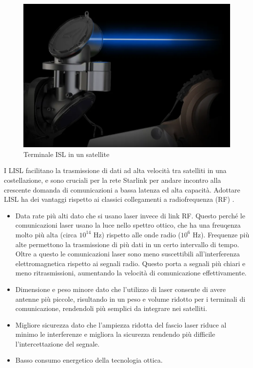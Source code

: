 \begin{figure}[htbp]
  \centering
  \includegraphics[width=0.9\linewidth]{./res/img/LISL_terminal.png}
  \caption{Terminale \ac{ISL} in un satellite \cite{mike_puchol_modeling_2022}}
  \label{fig:starlink-terminal}
\end{figure}

I \ac{LISL} facilitano la trasmissione di dati ad alta velocità tra satelliti in una costellazione, e sono cruciali per la rete Starlink per andare incontro alla crescente domanda di comunicazioni a bassa latenza ed alta capacità.
Adottare \ac{LISL} ha dei vantaggi rispetto ai classici collegamenti a radiofrequenza (\ac{RF}) \cite{chaudhry_laser_2021}.
\begin{itemize}
  \item Data rate più alti dato che si usano laser invece di link \ac{RF}. Questo perché le comunicazioni laser usano la luce nello spettro ottico, che ha una freuqenza molto più alta (circa $10^{14}$ Hz) rispetto alle onde radio ($10^{6}$ Hz). Frequenze più alte permettono la trasmissione di più dati in un certo intervallo di tempo. Oltre a questo le comunicazioni laser sono meno suscettibili all'interferenza elettromagnetica rispetto ai segnali radio. Questo porta a segnali più chiari e meno ritrasmissioni, aumentando la velocità di comunicazione effettivamente.
  \item Dimensione e peso minore dato che l'utilizzo di laser consente di avere antenne più piccole, risultando in un peso e volume ridotto per i terminali di comunicazione, rendendoli più semplici da integrare nei satelliti.
  \item Migliore sicurezza dato che l'ampiezza ridotta del fascio laser riduce al minimo le interferenze e migliora la sicurezza rendendo più difficile l'intercettazione del segnale.
  \item Basso consumo energetico della tecnologia ottica.
\end{itemize}

